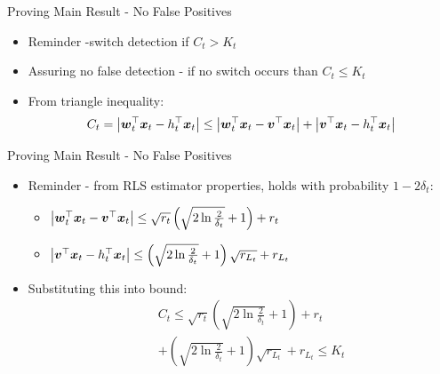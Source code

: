 \documentclass{beamer}
\begin{document}
%
%



\begin{frame}{Proving Main Result - No False Positives}
\begin{itemize}
\item Reminder -switch detection if $C_t>K_t$\newline
\item Assuring no false detection - if no switch occurs than $C_t\leq K_t$\newline
\item From triangle inequality:
\begin{equation}
C_t=\left\vert{{\boldsymbol{w}}}^{\top}_{t}{\boldsymbol{x}}_{t}-h_{t}^{\top}{\boldsymbol{x}}_{t}\right\vert\leq\left\vert{{\boldsymbol{w}}}^{\top}_{t}{\boldsymbol{x}}_{t}-{{\boldsymbol{v}}}^{\top}{\boldsymbol{x}}_{t}\right\vert+\left\vert{{\boldsymbol{v}}}^{\top}{\boldsymbol{x}}_{t}-h_{t}^{\top}{\boldsymbol{x}}_{t}\right\vert
\end{equation}
\end{itemize}
\end{frame}




\begin{frame}{Proving Main Result - No False Positives}
\begin{itemize}
\item Reminder - from RLS estimator properties, holds with probability $1-2\delta_t$:\newline
\begin{itemize}
\item $\left\vert{{\boldsymbol{w}}}^{\top}_{t}{\boldsymbol{x}}_{t}-{{\boldsymbol{v}}}^{\top}{\boldsymbol{x}}_{t}\right\vert\leq\sqrt{r_t}\left(\sqrt{2\ln{\frac{2}{\delta_t}}}+1\right)+r_t$\newline
\item $\left\vert{{\boldsymbol{v}}}^{\top}{\boldsymbol{x}}_{t}-h_{t}^{\top}{\boldsymbol{x}}_{t}\right\vert\leq\left(\sqrt{2\ln{\frac{2}{\delta_t}}}+1\right)\sqrt{r_{L_t}}+r_{L_t}$\newline
\end{itemize}
\item Substituting this into bound:
\begin{eqnarray*}
&&C_t\leq\sqrt{r_t}\left(\sqrt{2\ln{\frac{2}{\delta_t}}}+1\right)+r_t\\
&&+\left(\sqrt{2\ln{\frac{2}{\delta_t}}}+1\right)\sqrt{r_{L_t}}+r_{L_t}\leq K_t
\end{eqnarray*}
\end{itemize}
\end{frame}
\end{document}
